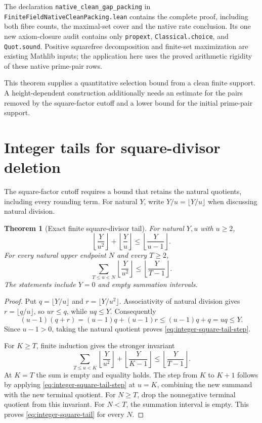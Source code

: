 \documentclass[11pt]{article}
\newtheorem{theorem}{Theorem}[section]
\begin{document}
The declaration
\texttt{native\_clean\_gap\_packing} in
\texttt{FiniteFieldNativeCleanPacking.\allowbreak lean}
contains the complete proof, including both fibre counts,
the maximal-set cover and the native rate conclusion.
Its one new axiom-closure audit contains only \texttt{propext},
\texttt{Classical.choice}, and \texttt{Quot.sound}.
Positive squarefree decomposition and finite-set maximization
are existing Mathlib inputs; the application here uses the
proved arithmetic rigidity of these native prime-pair rows.

This theorem supplies a quantitative selection bound from a clean
finite support. A height-dependent construction additionally needs
an estimate for the pairs removed by the square-factor cutoff and
a lower bound for the initial prime-pair support.

\section{Integer tails for square-divisor deletion}
\label{sec:integer-square-tail}

The square-factor cutoff requires a bound that retains the natural
quotients, including every rounding term. For natural \(Y\), write
\(Y/u=\lfloor Y/u\rfloor\) when discussing natural division.

\begin{theorem}[Exact finite square-divisor tail]
\label{thm:integer-square-tail}
For natural \(Y,u\) with \(u\ge2\),
\begin{equation}
 \left\lfloor\frac{Y}{u^2}\right\rfloor+
 \left\lfloor\frac{Y}{u}\right\rfloor
 \le \left\lfloor\frac{Y}{u-1}\right\rfloor.
 \label{eq:integer-square-tail-step}
\end{equation}
For every natural upper endpoint \(N\) and every \(T\ge2\),
\begin{equation}
 \sum_{T\le u<N}\left\lfloor\frac{Y}{u^2}\right\rfloor
       \le\left\lfloor\frac{Y}{T-1}\right\rfloor.
 \label{eq:integer-square-tail}
\end{equation}
The statements include \(Y=0\) and empty summation intervals.
\end{theorem}

\begin{proof}
Put \(q=\lfloor Y/u\rfloor\) and \(r=\lfloor Y/u^2\rfloor\).
Associativity of natural division gives \(r=\lfloor q/u\rfloor\),
so \(ur\le q\), while \(uq\le Y\).
Consequently
\[
 (u-1)(q+r)
   =(u-1)q+(u-1)r
   \le (u-1)q+q=uq\le Y.
\]
Since \(u-1>0\), taking the natural quotient proves
\eqref{eq:integer-square-tail-step}.

For \(K\ge T\), finite induction gives the stronger invariant
\[
 \sum_{T\le u<K}\left\lfloor\frac{Y}{u^2}\right\rfloor
       +\left\lfloor\frac{Y}{K-1}\right\rfloor
       \le\left\lfloor\frac{Y}{T-1}\right\rfloor.
\]
At \(K=T\) the sum is empty and equality holds.
The step from \(K\) to \(K+1\) follows by applying
\eqref{eq:integer-square-tail-step} at \(u=K\), combining the
new summand with the new terminal quotient.
For \(N\ge T\), drop the nonnegative terminal quotient from
this invariant. For \(N<T\), the summation interval is empty.
This proves \eqref{eq:integer-square-tail} for every \(N\).
\end{proof}
\end{document}
